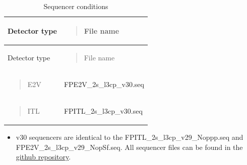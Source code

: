 \begin{longtable}[]{@{}
  >{\raggedright\arraybackslash}p{}
  >{\raggedright\arraybackslash}p{}@{}}
\caption{Sequencer conditions}\tabularnewline
\toprule\noalign{}
\begin{minipage}[b]{\linewidth}\raggedright
Detector type
\end{minipage} & \begin{minipage}[b]{\linewidth}\raggedright
\begin{quote}
File name
\end{quote}
\end{minipage} \\
\midrule\noalign{}
\endfirsthead
\toprule\noalign{}
\begin{minipage}[b]{\linewidth}\raggedright
Detector type
\end{minipage} & \begin{minipage}[b]{\linewidth}\raggedright
\begin{quote}
File name
\end{quote}
\end{minipage} \\
\midrule\noalign{}
\endhead
\bottomrule\noalign{}
\endlastfoot
\begin{minipage}[t]{\linewidth}\raggedright
\begin{quote}
E2V
\end{quote}
\end{minipage} &
FP\label{e2v_2s_l3cp_v30.seq}{E2V\_2s\_l3cp\_v30.seq} \\
\begin{minipage}[t]{\linewidth}\raggedright
\begin{quote}
ITL
\end{quote}
\end{minipage} &
FP\label{itl_2s_l3cp_v30.seq}{ITL\_2s\_l3cp\_v30.seq} \\
\end{longtable}

\begin{itemize}
\tightlist
\item
  v30 sequencers are identical to the
  FP\label{itl_2s_l3cp_v29_noppp.seq}{ITL\_2s\_l3cp\_v29\_Noppp.seq}
  and
  FP\label{e2v_2s_l3cp_v29_nopsf.seq}{E2V\_2s\_l3cp\_v29\_NopSf.seq}.
  All sequencer files can be found in the \href{https://github.com/lsst-camera-dh/sequencer-files/tree/master/run7}{github
  repository}.
\end{itemize}


